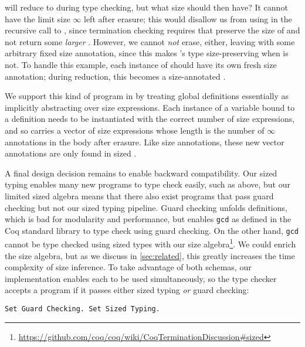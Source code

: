  will reduce to  during type checking, but what size should  then have?
It cannot have the limit size $\infty$ left after erasure; this would disallow us from using  in the recursive call to , since termination checking requires that  preserve the size of  and not return some \emph{larger} .
However, we cannot \textit{not} erase, either, leaving  with some arbitrary fixed size annotation, since this makes 's type size-preserving when  is not.
To handle this example, each instance of  should have its own fresh size annotation; during reduction, this becomes a size-annotated .

We support this kind of program in \lang by treating global definitions essentially as implicitly abstracting over size expressions.
Each instance of a variable bound to a definition needs to be instantiated with the correct number of size expressions, and so carries a vector of size expressions whose length is the number of $\infty$ annotations in the body after erasure.
Like size annotations, these new vector annotations are only found in sized \lang.

A final design decision remains to enable backward compatibility.
Our sized typing enables many new programs to type check easily, such as  above, but our limited sized algebra means that there also exist programs that pass guard checking but not our sized typing pipeline.
Guard checking unfolds definitions, which is bad for modularity and performance, but enables \texttt{gcd} as defined in the Coq standard library to type check using guard checking.
On the other hand, \texttt{gcd} cannot be type checked using sized types with our size algebra\footnote{\url{https://github.com/coq/coq/wiki/CoqTerminationDiscussion\#sized}}.
We could enrich the size algebra, but as we discuss in \autoref{sec:related}, this greatly increases the time complexity of size inference.
To take advantage of both schemas, our implementation enables each to be used simultaneously, so the type checker accepts a program if it passes either sized typing \textit{or} guard checking:

\begin{verbatim}
Set Guard Checking. Set Sized Typing.
\end{verbatim}

